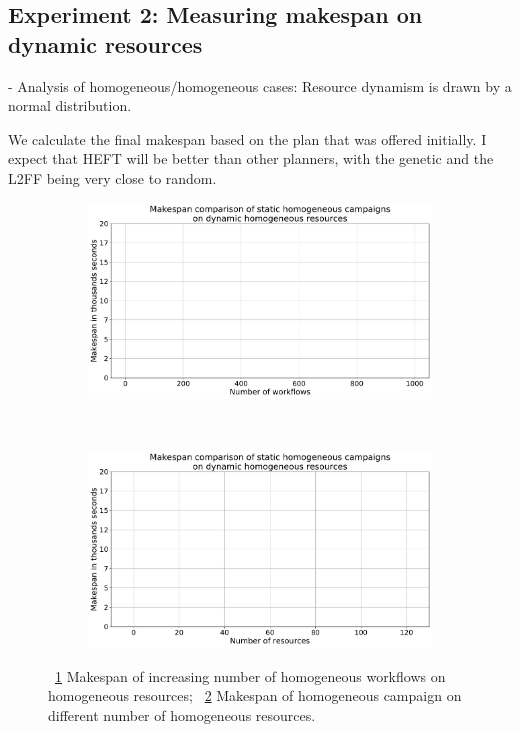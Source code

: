 \subsection{Experiment 2: Measuring makespan on dynamic resources}

- Analysis of homogeneous/homogeneous cases: Resource dynamism is drawn by a normal distribution.

We calculate the final makespan based on the plan that was offered initially.
 I expect that HEFT will be better than other planners, with the genetic and the L2FF being very close to random.
\begin{figure}[ht!]
    \centering
    \begin{subfigure}[b]{0.45\textwidth}
        \includegraphics[width=.95\textwidth]{figures/campaign/StHomoCampaigns_4DyHomoResources.pdf}
        \caption{}
        \label{fig:StHomoCampaigns_4DyHomoResources}
    \end{subfigure}%
    ~ 
    \begin{subfigure}[b]{0.45\textwidth}
        \includegraphics[width=\linewidth]{figures/campaign/DyHomoResources_StHomoCampaigns.pdf}
        \caption{}
        \label{fig:DyHomoResources_StHomoCampaigns}
    \end{subfigure}
    \caption{~\ref{fig:StHomoCampaigns_4DyHomoResources} Makespan of increasing number of homogeneous workflows on homogeneous resources;
        ~\ref{fig:DyHomoResources_StHomoCampaigns} Makespan of homogeneous campaign on different number of homogeneous resources.}
    \label{fig:no_replan_homog_analysis}
\end{figure}


